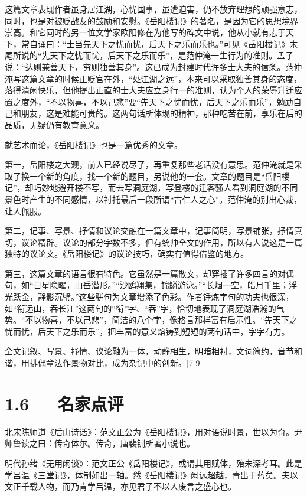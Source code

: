 \documentclass[letterpaper,10pt,english]{sphinxmanual}
\begin{document}
这篇文章表现作者虽身居江湖，心忧国事，虽遭迫害，仍不放弃理想的顽强意志，同时，也是对被贬战友的鼓励和安慰。《岳阳楼记》的著名，是因为它的思想境界崇高。和它同时的另一位文学家欧阳修在为他写的碑文中说，他从小就有志于天下，常自诵曰：“士当先天下之忧而忧，后天下之乐而乐也。”可见《岳阳楼记》末尾所说的“先天下之忧而忧，后天下之乐而乐”，是范仲淹一生行为的准则。孟子说：“达则兼善天下，穷则独善其身”。这已成为封建时代许多士大夫的信条。范仲淹写这篇文章的时候正贬官在外，“处江湖之远”，本来可以采取独善其身的态度，落得清闲快乐，但他提出正直的士大夫应立身行一的准则，认为个人的荣辱升迁应置之度外，“不以物喜，不以己悲”要“先天下之忧而忧，后天下之乐而乐”，勉励自己和朋友，这是难能可贵的。这两句话所体现的精神，那种吃苦在前，享乐在后的品质，无疑仍有教育意义。

就艺术而论，《岳阳楼记》也是一篇优秀的文章。

第一，岳阳楼之大观，前人已经说尽了，再重复那些老话没有意思。范仲淹就是采取了换一个新的角度，找一个新的题目，另说他的一套。文章的题目是“岳阳楼记”，却巧妙地避开楼不写，而去写洞庭湖，写登楼的迁客骚人看到洞庭湖的不同景色时产生的不同感情，以衬托最后一段所谓“古仁人之心”。范仲淹的别出心裁，让人佩服。

第二，记事、写景、抒情和议论交融在一篇文章中，记事简明，写景铺张，抒情真切，议论精辟。议论的部分字数不多，但有统帅全文的作用，所以有人说这是一篇独特的议论文。《岳阳楼记》的议论技巧，确实有值得借鉴的地方。

第三，这篇文章的语言很有特色。它虽然是一篇散文，却穿插了许多四言的对偶句，如“日星隐曜，山岳潜形。”“沙鸥翔集，锦鳞游泳。”“长烟一空，皓月千里；浮光跃金，静影沉璧。”这些骈句为文章增添了色彩。作者锤炼字句的功夫也很深，如“衔远山，吞长江”这两句的“衔”字、“吞”字，恰切地表现了洞庭湖浩瀚的气势。“不以物喜，不以己悲”，简洁的八个字，像格言那样富有启示性。“先天下之忧而忧，后天下之乐而乐”，把丰富的意义熔铸到短短的两句话中，字字有力。

全文记叙、写景、抒情、议论融为一体，动静相生，明暗相衬，文词简约，音节和谐，用排偶章法作景物对比，成为杂记中的创新。{[}7-9{]}


\section{1.6   名家点评}
\label{\detokenize{p01_u6563_u6587/_u8303_u4ef2_u6df9-_u5cb3_u9633_u697c_u8bb0:id8}}
北宋陈师道《后山诗话》：范文正公为《岳阳楼记》，用对语说时景，世以为奇。尹师鲁读之曰：传奇体尔。传奇，唐裴铏所著小说也。

明代孙绪《无用闲谈》：范文正公《岳阳楼记》，或谓其用赋体，殆未深考耳。此是学吕温《三堂记》，体制如出一轴。然《岳阳楼记》闳远超越，青出于蓝矣。夫以文正千载人物，而乃肯学吕温，亦见君子不以人废言之盛心也。
\end{document}
